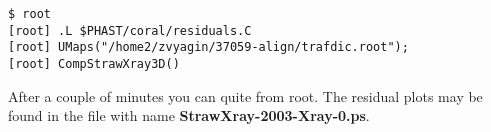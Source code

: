 \documentclass[a4paper,12pt]{article}
\begin{document}
\begin{enumerate}
\begin{verbatim}
$ root
[root] .L $PHAST/coral/residuals.C
[root] UMaps("/home2/zvyagin/37059-align/trafdic.root");
[root] CompStrawXray3D()
\end{verbatim}

After a couple of minutes you can quite from root. The residual plots
may be found in the file with name {\bf StrawXray-2003-Xray-0.ps}.







\end{enumerate}
\end{document}

